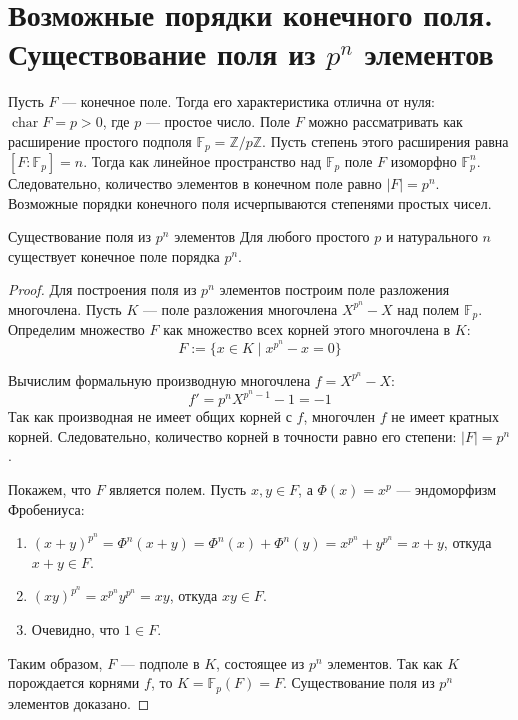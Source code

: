 
\section{Возможные порядки конечного поля. Существование поля из $p^n$ элементов}

Пусть $F$ --- конечное поле. Тогда его характеристика отлична от нуля: $\operatorname{char} F = p > 0$, где $p$ --- простое число.
Поле $F$ можно рассматривать как расширение простого подполя $\mathbb{F}_p = \mathbb{Z}/p\mathbb{Z}$.
Пусть степень этого расширения равна $[F : \mathbb{F}_p] = n$. Тогда как линейное пространство над $\mathbb{F}_p$ поле $F$ изоморфно $\mathbb{F}_p^n$. Следовательно, количество элементов в конечном поле равно $|F| = p^n$. Возможные порядки конечного поля исчерпываются степенями простых чисел.

\begin{Theorem}{Существование поля из $p^n$ элементов}{}
	Для любого простого $p$ и натурального $n$ существует конечное поле порядка $p^n$.
\end{Theorem}

\begin{proof}
	Для построения поля из $p^n$ элементов построим поле разложения многочлена. Пусть $K$ --- поле разложения многочлена $X^{p^n} - X$ над полем $\mathbb{F}_p$. Определим множество $F$ как множество всех корней этого многочлена в $K$:
	\[ F := \{ x \in K \mid x^{p^n} - x = 0 \} \]

	Вычислим формальную производную многочлена $f = X^{p^n} - X$:
	\[ f' = p^n X^{p^n - 1} - 1 = -1 \]
	Так как производная не имеет общих корней с $f$, многочлен $f$ не имеет кратных корней. Следовательно, количество корней в точности равно его степени: $|F| = p^n$.

	Покажем, что $F$ является полем.
	Пусть $x, y \in F$, а $\Phi(x) = x^p$ — эндоморфизм Фробениуса:
	\begin{enumerate}
		\item $(x+y)^{p^n} = \Phi^n(x+y) = \Phi^n(x) + \Phi^n(y) = x^{p^n} + y^{p^n} = x + y$, откуда $x+y \in F$.
		\item $(xy)^{p^n} = x^{p^n}y^{p^n} = xy$, откуда $xy \in F$.
		\item Очевидно, что $1 \in F$.
	\end{enumerate}
	Таким образом, $F$ --- подполе в $K$, состоящее из $p^n$ элементов. Так как $K$ порождается корнями $f$, то $K = \mathbb{F}_p(F) = F$. Существование поля из $p^n$ элементов доказано.
\end{proof}

